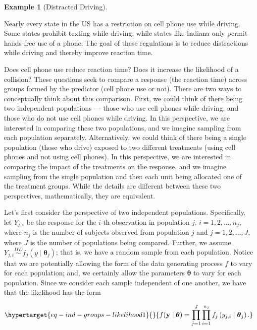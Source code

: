 \documentclass[
  letterpaper,
  DIV=11,
  numbers=noendperiod]{scrreprt}
\theoremstyle{definition}
\newtheorem{example}{Example}[chapter]
\theoremstyle{definition}
\theoremstyle{plain}
\theoremstyle{remark}
\begin{document}
\begin{example}[Distracted
Driving]\protect\hypertarget{exm-distracted-driving}{}\label{exm-distracted-driving}

Nearly every state in the US has a restriction on cell phone use while
driving. Some states prohibit texting while driving, while states like
Indiana only permit hands-free use of a phone. The goal of these
regulations is to reduce distractions while driving and thereby improve
reaction time.

\end{example}

Does cell phone use reduce reaction time? Does it increase the
likelihood of a collision? These questions seek to compare a response
(the reaction time) across groups formed by the predictor (cell phone
use or not). There are two ways to conceptually think about this
comparison. First, we could think of there being two independent
populations --- those who use cell phones while driving, and those who
do not use cell phones while driving. In this perspective, we are
interested in comparing these two populations, and we imagine sampling
from each population separately. Alternatively, we could think of there
being a single population (those who drive) exposed to two different
treatments (using cell phones and not using cell phones). In this
perspective, we are interested in comparing the impact of the treatments
on the response, and we imagine sampling from the single population and
then each unit being allocated one of the treatment groups. While the
details are different between these two perspectives, mathematically,
they are equivalent.

Let's first consider the perspective of two independent populations.
Specifically, let \(Y_{j,i}\) be the response for the \(i\)-th
observation in population \(j\), \(i = 1, 2, \dotsc, n_j\), where
\(n_j\) is the number of subjects observed from population \(j\) and
\(j = 1, 2, \dotsc, J\), where \(J\) is the number of populations being
compared. Further, we assume
\(Y_{j, i} \stackrel{IID}{\sim} f_j\left(y \mid \boldsymbol{\theta}_j\right)\);
that is, we have a random sample from each population. Notice that we
are potentially allowing the form of the data generating process \(f\)
to vary for each population; and, we certainly allow the parameters
\(\boldsymbol{\theta}\) to vary for each population. Since we consider
each sample independent of one another, we have that the likelihood has
the form

\begin{equation}\protect\hypertarget{eq-ind-groups-likelihood1}{}{f(\mathbf{y} \mid \boldsymbol{\theta}) = \prod_{j=1}^{J} \prod_{i=1}^{n_j} f_j\left(y_{j, i} \mid \boldsymbol{\theta}_j\right).}\label{eq-ind-groups-likelihood1}\end{equation}
\end{document}
